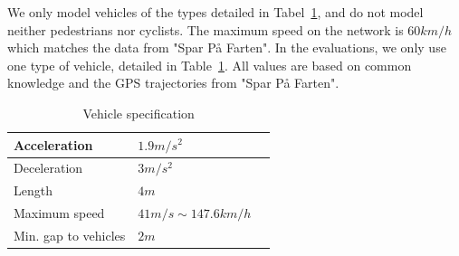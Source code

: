 We only model vehicles of the types detailed in Tabel~\ref{table.vehicleTypes}, and do not model neither pedestrians nor cyclists.
The maximum speed on the network is $60km/h$ which matches the data from "Spar På Farten".
In the evaluations, we only use one type of vehicle, detailed in Table~\ref{table.vehicleTypes}. 
All values are based on common knowledge and the GPS trajectories from "Spar På Farten".%

\begin{table}
\centering
\begin{tabular}{|l|l|l|}\hline
Acceleration			& $1.9 m/s^2$	\\\hline
Deceleration			& $3 m/s^2$ 	\\\hline
Length					& $4 m$ 		\\\hline
Maximum speed			& $41 m/s \sim 147.6 km/h$ \\\hline
Min. gap to vehicles	& $2 m$ 		\\\hline
\end{tabular}
\caption{Vehicle specification}\label{table.vehicleTypes}
\end{table}



